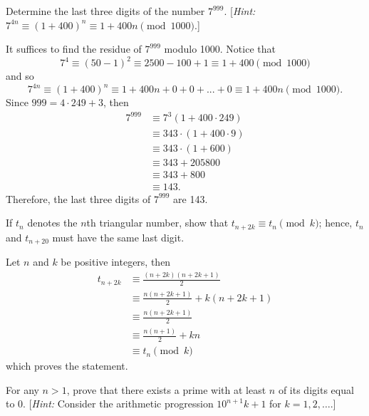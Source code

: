 \begin{exercise}
    Determine the last three digits of the number $7^{999}$. [\textit{Hint:} $7^{4n} \equiv (1 + 400)^n \equiv 1 + 400n \pmod{1000}$.] \\
\end{exercise}

\begin{solution}
    It suffices to find the residue of $7^{999}$ modulo 1000. Notice that
    $$7^4 \equiv (50-1)^2 \equiv 2500 - 100 + 1 \equiv 1 + 400 \pmod{1000}$$
    and so 
    $$7^{4n} \equiv (1 + 400)^n \equiv 1 + 400n + 0 + 0 + ... + 0 \equiv 1 + 400n \pmod{1000}.$$
    Since $999 = 4\cdot 249 + 3$, then 
    \begin{align*}
        7^{999} &\equiv 7^3 (1 + 400 \cdot 249) \\
        &\equiv 343 \cdot (1 + 400 \cdot 9) \\
        &\equiv 343 \cdot (1 + 600) \\
        &\equiv 343 + 205800 \\
        &\equiv 343 + 800 \\
        &\equiv 143.
    \end{align*}
    Therefore, the last three digits of $7^{999}$ are 143. \\
\end{solution}

\begin{exercise}
    If $t_n$ denotes the $n$th triangular number, show that $t_{n + 2k} \equiv t_n \pmod{k}$; hence, $t_n$ and $t_{n + 20}$ must have the same last digit. \\
\end{exercise}

\begin{solution}
    Let $n$ and $k$ be positive integers, then
    \begin{align*}
        t_{n + 2k} &\equiv \frac{(n + 2k)(n + 2k + 1)}{2} \\
        &\equiv \frac{n(n + 2k + 1)}{2} + k(n + 2k + 1) \\
        &\equiv \frac{n(n + 2k + 1)}{2} \\
        &\equiv \frac{n(n+1)}{2} + kn \\
        &\equiv t_n \pmod k
    \end{align*}
    which proves the statement. \\
\end{solution}

\begin{exercise}
    For any $n > 1$, prove that there exists a prime with at least $n$ of its digits equal to 0. [\textit{Hint:} Consider the arithmetic progression $10^{n+1}k + 1$ for $k = 1,2,\dots$.] \\
\end{exercise}

